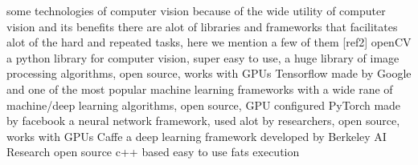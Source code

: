     some technologies of computer vision
        because of the wide utility of computer vision and its benefits there are alot of libraries and frameworks that facilitates alot of the hard and repeated tasks, here we mention a few of them [ref2]
        openCV 
            a python library for computer vision, 
                super easy to use, 
                a huge library of image processing algorithms, 
                open source, 
                works with GPUs
        Tensorflow
            made by Google and one of the most popular machine learning frameworks 
                with a wide rane of machine/deep learning algorithms, 
                open source, 
                GPU configured
        PyTorch
            made by facebook a neural network framework, 
                used alot by researchers, 
                open source, 
                works with GPUs
        Caffe
            a deep learning framework developed by Berkeley AI Research
                open source
                c++ based 
                easy to use
                fats execution 



